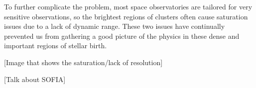 To further complicate the problem, most space observatories are tailored for very sensitive observations, so the brightest regions of clusters often cause saturation issues due to a lack of dynamic range. These two issues have continually prevented us from gathering a good picture of the physics in these dense and important regions of stellar birth.

[Image that shows the saturation/lack of resolution]

[Talk about SOFIA]
%
